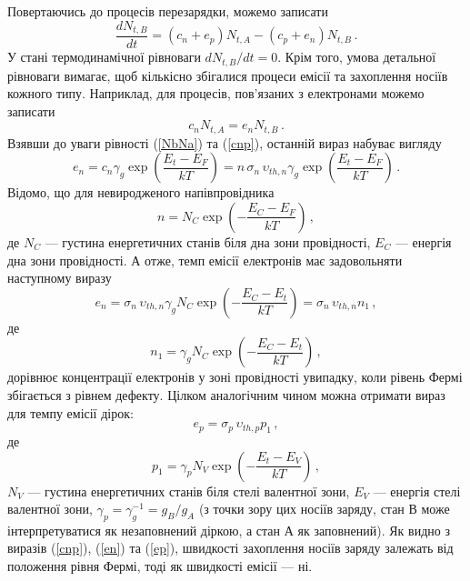 Повертаючись до процесів перезарядки, можемо записати
\begin{equation}
\label{dNdt}
 \frac{dN_{t,B}}{dt}=\left(c_n+e_p\right)N_{t,A}-\left(c_p+e_n\right)N_{t,B}\,.
\end{equation}
У стані термодинамічної рівноваги $dN_{t,B}/dt=0$.
Крім того, умова детальної рівноваги вимагає, щоб кількісно збігалися
процеси емісії та захоплення носіїв кожного типу.
Наприклад, для процесів, пов'язаних з електронами можемо записати
\begin{equation}
\label{rivn}
 c_nN_{t,A}=e_nN_{t,B}\,.
\end{equation}
Взявши до уваги рівності (\ref{NbNa}) та (\ref{cnp}), останній вираз набуває вигляду
\begin{equation}
\label{ecn}
e_n=c_n\gamma_g\exp\left(\frac{E_t-E_F}{kT}\right)=n\,\sigma_n\,\upsilon_{th,n}\gamma_g\exp\left(\frac{E_t-E_F}{kT}\right)\,.
\end{equation}
Відомо, що для невиродженого напівпровідника
\begin{equation}
\label{n}
n=N_C\exp\left(-\frac{E_C-E_F}{kT}\right)\,,
\end{equation}
де
$N_C$ --- густина енергетичних станів біля дна зони провідності,
$E_C$ --- енергія дна зони провідності.
А отже, темп емісії електронів має задовольняти наступному виразу
\begin{equation}
\label{en}
e_n=\sigma_n\,\upsilon_{th,n}\gamma_g N_C \exp\left(-\frac{E_C-E_t}{kT}\right)=\sigma_n\,\upsilon_{th,n}n_1\,,
\end{equation}
де
\begin{equation}
\label{n1}
n_1=\gamma_g N_C \exp\left(-\frac{E_C-E_t}{kT}\right)\,,
\end{equation}
дорівнює концентрації електронів у зоні провідності увипадку, коли рівень Фермі
збігається з рівнем дефекту.
Цілком аналогічним чином можна отримати вираз для темпу емісії дірок:
\begin{equation}
\label{ep}
e_p=\sigma_p\,\upsilon_{th,p}p_1\,,
\end{equation}
де
\begin{equation}
\label{p1}
p_1=\gamma_p N_V \exp\left(-\frac{E_t-E_V}{kT}\right)\,,
\end{equation}
$N_V$ --- густина енергетичних станів біля стелі валентної зони,
$E_V$ --- енергія стелі валентної зони,
$\gamma_p=\gamma_g^{-1}=g_{B}/g_{A}$ (з точки зору цих носіїв заряду, стан В може інтерпретуватися як незаповнений діркою,
а стан А як заповнений).
Як видно з виразів (\ref{cnp}), (\ref{en}) та  (\ref{ep}),
швидкості захоплення носіїв заряду залежать від положення рівня Фермі,
тоді як швидкості емісії --- ні.

